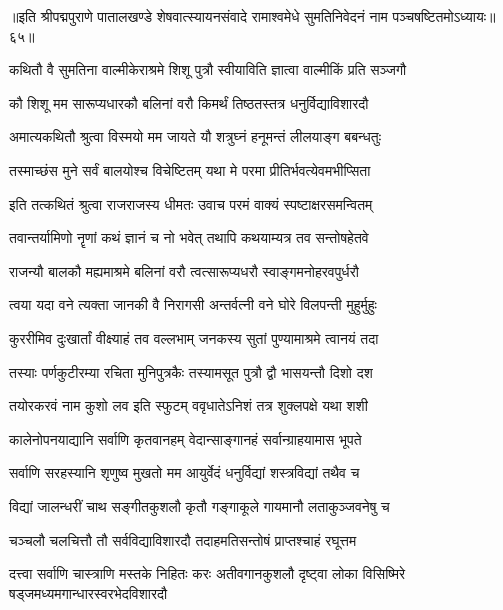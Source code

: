 {॥इति श्रीपद्मपुराणे पातालखण्डे शेषवात्स्यायनसंवादे रामाश्वमेधे सुमतिनिवेदनं नाम पञ्चषष्टितमोऽध्यायः॥६५॥}

\resetShloka


\twolineshloka
{कथितौ वै सुमतिना वाल्मीकेराश्रमे शिशू}
{पुत्रौ स्वीयाविति ज्ञात्वा वाल्मीकिं प्रति सञ्जगौ}%


\twolineshloka
{कौ शिशू मम सारूप्यधारकौ बलिनां वरौ}
{किमर्थं तिष्ठतस्तत्र धनुर्विद्याविशारदौ}%

\twolineshloka
{अमात्यकथितौ श्रुत्वा विस्मयो मम जायते}
{यौ शत्रुघ्नं हनूमन्तं लीलयाङ्ग बबन्धतुः}%

\twolineshloka
{तस्माच्छंस मुने सर्वं बालयोश्च विचेष्टितम्}
{यथा मे परमा प्रीतिर्भवत्येवमभीप्सिता}%

\twolineshloka
{इति तत्कथितं श्रुत्वा राजराजस्य धीमतः}
{उवाच परमं वाक्यं स्पष्टाक्षरसमन्वितम्}%


\twolineshloka
{तवान्तर्यामिणो नॄणां कथं ज्ञानं च नो भवेत्}
{तथापि कथयाम्यत्र तव सन्तोषहेतवे}%

\twolineshloka
{राजन्यौ बालकौ मह्यमाश्रमे बलिनां वरौ}
{त्वत्सारूप्यधरौ स्वाङ्गमनोहरवपुर्धरौ}%

\twolineshloka
{त्वया यदा वने त्यक्ता जानकी वै निरागसी}
{अन्तर्वत्नी वने घोरे विलपन्ती मुहुर्मुहुः}%

\twolineshloka
{कुररीमिव दुःखार्तां वीक्ष्याहं तव वल्लभाम्}
{जनकस्य सुतां पुण्यामाश्रमे त्वानयं तदा}%

\twolineshloka
{तस्याः पर्णकुटीरम्या रचिता मुनिपुत्रकैः}
{तस्यामसूत पुत्रौ द्वौ भासयन्तौ दिशो दश}%

\twolineshloka
{तयोरकरवं नाम कुशो लव इति स्फुटम्}
{ववृधातेऽनिशं तत्र शुक्लपक्षे यथा शशी}%

\twolineshloka
{कालेनोपनयाद्यानि सर्वाणि कृतवानहम्}
{वेदान्साङ्गानहं सर्वान्ग्राहयामास भूपते}%

\twolineshloka
{सर्वाणि सरहस्यानि शृणुष्व मुखतो मम}
{आयुर्वेदं धनुर्विद्यां शस्त्रविद्यां तथैव च}%

\twolineshloka
{विद्यां जालन्धरीं चाथ सङ्गीतकुशलौ कृतौ}
{गङ्गाकूले गायमानौ लताकुञ्जवनेषु च}%

\twolineshloka
{चञ्चलौ चलचित्तौ तौ सर्वविद्याविशारदौ}
{तदाहमतिसन्तोषं प्राप्तश्चाहं रघूत्तम}%


\threelineshloka
{दत्त्वा सर्वाणि चास्त्राणि मस्तके निहितः करः}
{अतीवगानकुशलौ दृष्ट्वा लोका विसिष्मिरे}
{षड्जमध्यमगान्धारस्वरभेदविशारदौ}%

